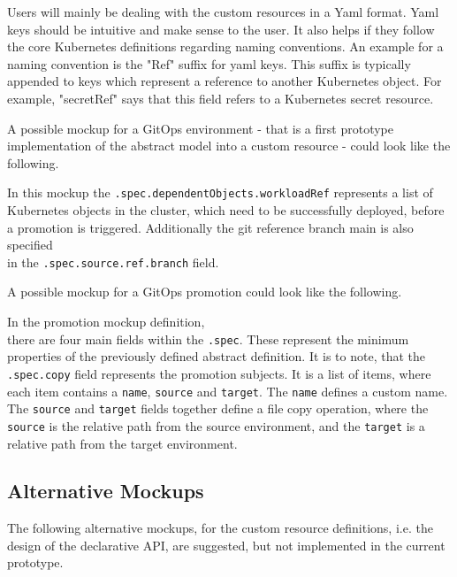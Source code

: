 Users will mainly be dealing with the custom resources in a Yaml format.
Yaml keys should be intuitive and make sense to the user.
It also helps if they follow the core Kubernetes definitions regarding naming conventions.
An example for a naming convention is the "Ref" suffix for yaml keys.
This suffix is typically appended to keys which represent a reference to another Kubernetes
object.
For example, "secretRef" says that this field refers to a Kubernetes secret resource.

A possible mockup for a GitOps environment -
that is a first prototype implementation of the abstract model into a custom resource -
could look like the following.



In this mockup the \lstinline|.spec.dependentObjects.workloadRef|
represents a list of Kubernetes objects in the cluster,
which need to be successfully deployed,
before a promotion is triggered.
Additionally the git reference branch main is also specified \\
in the \lstinline|.spec.source.ref.branch| field.

A possible mockup for a GitOps promotion 
could look like the following.



In the promotion mockup definition,\\
there are four main fields within the \lstinline|.spec|.
These represent the minimum properties of the previously defined abstract definition.
It is to note, that
the \lstinline|.spec.copy| field represents the promotion subjects.
It is a list of items, where each item contains
a \lstinline|name|, \lstinline|source| and \lstinline|target|.
The \lstinline|name| defines a custom name.
The \lstinline|source| and \lstinline|target| fields together define a
file copy operation,
where the \lstinline|source| is the relative path from the source environment,
and the \lstinline|target| is a relative path from the target environment.

\subsection{Alternative Mockups}

The following alternative mockups,
for the custom resource definitions,
i.e. the design of the declarative API,
are suggested, but not implemented in the current prototype.

